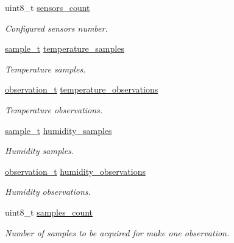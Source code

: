 \begin{DoxyCompactItemize}
uint8\+\_\+t \hyperlink{i2c-th_8h_a7727577f63dfa4aa55feb7ddd0739f83}{sensors\+\_\+count}
\begin{DoxyCompactList}\small\item\em Configured sensors number. \end{DoxyCompactList}\item 
\mbox{\label{i2c-th_8h_a3d666fceb96c16f06f662120dac2b616}} 
\hyperlink{structsample__t}{sample\+\_\+t} \hyperlink{i2c-th_8h_a3d666fceb96c16f06f662120dac2b616}{temperature\+\_\+samples}
\begin{DoxyCompactList}\small\item\em Temperature samples. \end{DoxyCompactList}\item 
\mbox{\label{i2c-th_8h_a3d73872b407d68a2858f5fd4104b8f46}} 
\hyperlink{structobservation__t}{observation\+\_\+t} \hyperlink{i2c-th_8h_a3d73872b407d68a2858f5fd4104b8f46}{temperature\+\_\+observations}
\begin{DoxyCompactList}\small\item\em Temperature observations. \end{DoxyCompactList}\item 
\mbox{\label{i2c-th_8h_ac23e316e62b5e278d2122628612aeaff}} 
\hyperlink{structsample__t}{sample\+\_\+t} \hyperlink{i2c-th_8h_ac23e316e62b5e278d2122628612aeaff}{humidity\+\_\+samples}
\begin{DoxyCompactList}\small\item\em Humidity samples. \end{DoxyCompactList}\item 
\mbox{\label{i2c-th_8h_a6bac5b18b7caba6c00adfbf8c6cd909f}} 
\hyperlink{structobservation__t}{observation\+\_\+t} \hyperlink{i2c-th_8h_a6bac5b18b7caba6c00adfbf8c6cd909f}{humidity\+\_\+observations}
\begin{DoxyCompactList}\small\item\em Humidity observations. \end{DoxyCompactList}\item 
\mbox{\label{i2c-th_8h_a9a06fc202d1070e79bc838d46b69c7d1}} 
uint8\+\_\+t \hyperlink{i2c-th_8h_a9a06fc202d1070e79bc838d46b69c7d1}{samples\+\_\+count}
\begin{DoxyCompactList}\small\item\em Number of samples to be acquired for make one observation. \end{DoxyCompactList}\item 

\end{DoxyCompactItemize}
